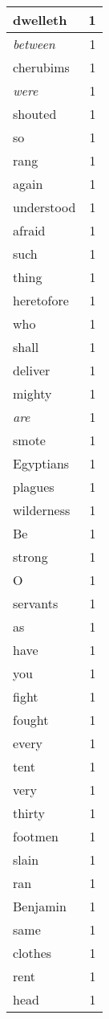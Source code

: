 \begin{center}
\begin{longtable}{l|r}
dwelleth & 1 \\ \hline
\emph{between} & 1 \\ \hline
cherubims & 1 \\ \hline
\emph{were} & 1 \\ \hline
shouted & 1 \\ \hline
so & 1 \\ \hline
rang & 1 \\ \hline
again & 1 \\ \hline
understood & 1 \\ \hline
afraid & 1 \\ \hline
such & 1 \\ \hline
thing & 1 \\ \hline
heretofore & 1 \\ \hline
who & 1 \\ \hline
shall & 1 \\ \hline
deliver & 1 \\ \hline
mighty & 1 \\ \hline
\emph{are} & 1 \\ \hline
smote & 1 \\ \hline
Egyptians & 1 \\ \hline
plagues & 1 \\ \hline
wilderness & 1 \\ \hline
Be & 1 \\ \hline
strong & 1 \\ \hline
O & 1 \\ \hline
servants & 1 \\ \hline
as & 1 \\ \hline
have & 1 \\ \hline
you & 1 \\ \hline
fight & 1 \\ \hline
fought & 1 \\ \hline
every & 1 \\ \hline
tent & 1 \\ \hline
very & 1 \\ \hline
thirty & 1 \\ \hline
footmen & 1 \\ \hline
slain & 1 \\ \hline
ran & 1 \\ \hline
Benjamin & 1 \\ \hline
same & 1 \\ \hline
clothes & 1 \\ \hline
rent & 1 \\ \hline
head & 1 \\ \hline

\end{longtable}
\end{center}
